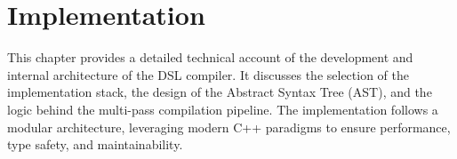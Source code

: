 \chapter{Implementation}\label{ch:implementation}

This chapter provides a detailed technical account of the development and internal architecture of the DSL compiler.
It discusses the selection of the implementation stack, the design of the Abstract Syntax Tree (AST), and the
logic behind the multi-pass compilation pipeline.
The implementation follows a modular architecture, leveraging modern C++ paradigms to ensure performance,
type safety, and maintainability.









